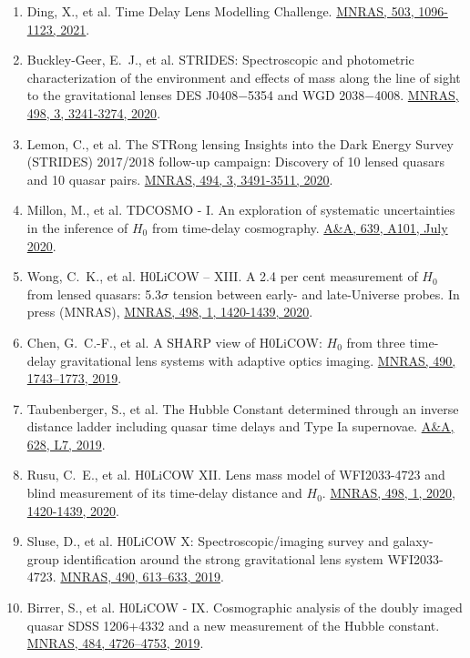 \documentclass[margin, line]{res}
\begin{document}
\begin{resume}
\begin{enumerate}
	\item Ding, X., et al. Time Delay Lens Modelling Challenge. \href{https://ui.adsabs.harvard.edu/abs/2021MNRAS.503.1096D/abstract}{MNRAS, 503, 1096-1123, 2021}.
	\item Buckley-Geer, E.~J., et al. STRIDES: Spectroscopic and photometric characterization of the environment and effects of mass along the line of sight to the gravitational lenses DES J0408$-$5354 and WGD 2038$-$4008. \href{https://ui.adsabs.harvard.edu/abs/2020MNRAS.498.3241B/abstract}{MNRAS, 498, 3, 3241-3274, 2020}.
	\item Lemon, C., et al. The STRong lensing Insights into the Dark Energy Survey (STRIDES) 2017/2018 follow-up campaign: Discovery of 10 lensed quasars and 10 quasar pairs. \href{https://doi.org/10.1093/mnras/staa652}{MNRAS, 494, 3, 3491-3511, 2020}.
	\item Millon, M., et al. TDCOSMO - I. An exploration of systematic uncertainties in the inference of $H_0$ from time-delay cosmography. \href{https://doi.org/10.1051/0004-6361/201937351}{A\&A, 639, A101, July 2020}.
	\item Wong, C.~K., et al. H0LiCOW – XIII. A 2.4 per cent measurement of $H_0$ from lensed quasars: 5.3$\sigma$ tension between early- and late-Universe probes. In press (MNRAS), \href{https://doi.org/10.1093/mnras/stz3094}{MNRAS, 498, 1, 1420-1439, 2020}.
	\item Chen, G.~C.-F., et al. A SHARP view of H0LiCOW: $H_0$ from three time-delay gravitational lens systems with adaptive optics imaging. \href{https://academic.oup.com/mnras/article/doi/10.1093/mnras/stz2547/5568378/}{MNRAS, 490, 1743--1773, 2019}.
	\item Taubenberger, S., et al. The Hubble Constant determined through an inverse distance ladder including quasar time delays and Type Ia supernovae. \href{https://www.aanda.org/articles/aa/abs/2019/08/aa35980-19/aa35980-19.html}{A\&A, 628, L7, 2019}.
	\item Rusu, C.~E., et al. H0LiCOW XII. Lens mass model of WFI2033-4723 and blind measurement of its time-delay distance and $H_0$. \href{http://adsabs.harvard.edu/abs/2019arXiv190509338R}{MNRAS, 498, 1, 2020, 1420-1439, 2020}.
	\item Sluse, D., et al. H0LiCOW X: Spectroscopic/imaging survey and galaxy-group identification around the strong gravitational lens system WFI2033-4723. \href{https://academic.oup.com/mnras/article/doi/10.1093/mnras/stz2483/5561514/}{MNRAS, 490, 613--633, 2019}.
	\item Birrer, S., et al. H0LiCOW - IX. Cosmographic analysis of the doubly imaged quasar SDSS 1206+4332 and a new measurement of the Hubble constant. \href{https://doi.org/10.1093/mnras/stz200}{MNRAS, 484, 4726--4753, 2019}.

\end{enumerate}
\end{resume}
\end{document}
